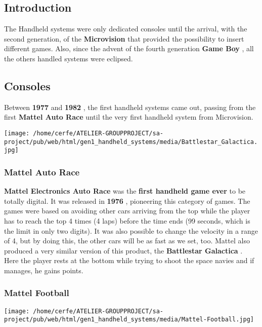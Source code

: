 \documentclass[a4paper,10pt]{book}
\begin{document}
 \subsection{Introduction }
 
          The Handheld systems were only dedicated consoles until the arrival, with the second generation, of
          the  \textbf{Microvision }  that provided the possibility to insert different games. Also, since the advent of
          the fourth generation  \textbf{Game Boy } , all the others handled systems were eclipsed.  
 
 
 \subsection{Consoles }
 
          Between  \textbf{1977 }  and  \textbf{1982 } , the first handheld systems came out, passing from the first
           \textbf{Mattel Auto Race }  until the very first handheld system from Microvision.
         
 
 \texttt{[image: /home/cerfe/ATELIER-GROUPPROJECT/sa-project/pub/web/html/gen1\_handheld\_systems/media/Battlestar\_Galactica.jpg]}
 \subsubsection{Mattel Auto Race }
 
 \textbf{Mattel Electronics Auto Race }  was the  \textbf{first handheld game ever }  to be totally digital.
            It was released in  \textbf{1976 } , pioneering this category of games. The games were based on avoiding other cars
            arriving from the top while the player has to reach the top 4 times (4 laps) before the time ends (99 seconds,
            which is the limit in only two digits). It was also possible to change the velocity in a range of 4, but by doing
            this, the other cars will be as fast as we set, too.  
            Mattel also produced a very similar version of this product, the  \textbf{Battlestar Galactica } .
            Here the player rests at the bottom while trying to shoot the space navies and if manages, he gains points.
           
 
 
 
 \subsubsection{Mattel Football }
 \texttt{[image: /home/cerfe/ATELIER-GROUPPROJECT/sa-project/pub/web/html/gen1\_handheld\_systems/media/Mattel-Football.jpg]}
 
\end{document}
